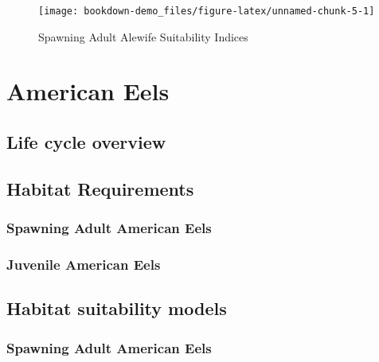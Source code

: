 \documentclass[
]{book}
\begin{document}
\begin{figure}

{\centering \texttt{[image: bookdown-demo\_files/figure-latex/unnamed-chunk-5-1]} 

}

\caption{Spawning Adult Alewife Suitability Indices}\label{fig:unnamed-chunk-5}
\end{figure}

\hypertarget{american-eels}{%
\chapter{American Eels}\label{american-eels}}

\hypertarget{life-cycle-overview-1}{%
\section{Life cycle overview}\label{life-cycle-overview-1}}

\hypertarget{habitat-requirements-1}{%
\section{Habitat Requirements}\label{habitat-requirements-1}}

\hypertarget{spawning-adult-american-eels}{%
\subsection{Spawning Adult American Eels}\label{spawning-adult-american-eels}}

\hypertarget{juvenile-american-eels}{%
\subsection{Juvenile American Eels}\label{juvenile-american-eels}}

\hypertarget{habitat-suitability-models-1}{%
\section{Habitat suitability models}\label{habitat-suitability-models-1}}

\hypertarget{spawning-adult-american-eels-1}{%
\subsection{Spawning Adult American Eels}\label{spawning-adult-american-eels-1}}
\end{document}
